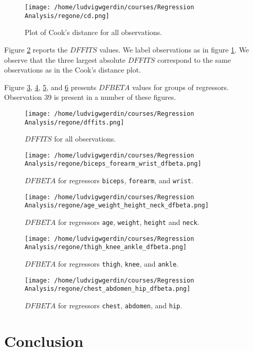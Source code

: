 \documentclass[11pt]{article}
\begin{document}
\begin{figure}[h]
\centering
\texttt{[image: /home/ludvigwgerdin/courses/Regression Analysis/regone/cd.png]}
\caption{\label{fig:org6979ff3}
Plot of Cook's distance for all observations.}
\end{figure}

Figure \ref{fig:org135d653} reports the \(DFFITS\) values. We label observations as in figure \ref{fig:org6979ff3}. We observe 
that the three largest absolute \(DFFITS\) correspond to the same observations as in the Cook's distance plot.

Figure \ref{fig:org329c214}, \ref{fig:org08012db}, \ref{fig:orgfbb0b29}, and
\ref{fig:org1fc6e9a} presents \(DFBETA\) values for groups of regressors. Observation 39
is present in a number of these figures.
\begin{figure}[h]
\centering
\texttt{[image: /home/ludvigwgerdin/courses/Regression Analysis/regone/dffits.png]}
\caption{\label{fig:org135d653}
\(DFFITS\) for all observations.}
\end{figure}

\begin{figure}[h]
\centering
\texttt{[image: /home/ludvigwgerdin/courses/Regression Analysis/regone/biceps\_forearm\_wrist\_dfbeta.png]}
\caption{\label{fig:org329c214}
\(DFBETA\) for regressors \texttt{biceps}, \texttt{forearm}, and \texttt{wrist}.}
\end{figure}

\begin{figure}[h]
\centering
\texttt{[image: /home/ludvigwgerdin/courses/Regression Analysis/regone/age\_weight\_height\_neck\_dfbeta.png]}
\caption{\label{fig:org08012db}
\(DFBETA\) for regressors \texttt{age}, \texttt{weight}, \texttt{height} and \texttt{neck}.}
\end{figure}

\begin{figure}[h]
\centering
\texttt{[image: /home/ludvigwgerdin/courses/Regression Analysis/regone/thigh\_knee\_ankle\_dfbeta.png]}
\caption{\label{fig:orgfbb0b29}
\(DFBETA\) for regressors \texttt{thigh}, \texttt{knee}, and \texttt{ankle}.}
\end{figure}

\begin{figure}[h]
\centering
\texttt{[image: /home/ludvigwgerdin/courses/Regression Analysis/regone/chest\_abdomen\_hip\_dfbeta.png]}
\caption{\label{fig:org1fc6e9a}
\(DFBETA\) for regressors \texttt{chest}, \texttt{abdomen}, and \texttt{hip}.}
\end{figure}

\section{Conclusion}
\label{sec:orgf9d7f82}


\end{document}
